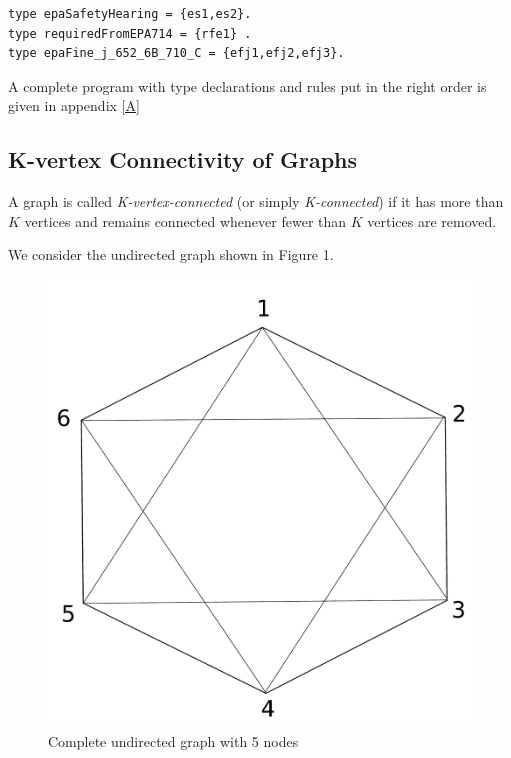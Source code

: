 \documentclass[a4paper,10pt]{article}
\begin{document}
\begin{verbatim}
type epaSafetyHearing = {es1,es2}.
type requiredFromEPA714 = {rfe1} .
type epaFine_j_652_6B_710_C = {efj1,efj2,efj3}.
\end{verbatim}

\medskip\noindent
A complete program with type declarations and rules put in the right order is given in appendix \ref{A}
   
\subsection{K-vertex Connectivity of Graphs}

A graph is called \textit{K-vertex-connected} (or simply \textit{K-connected})  if it has more than $K$ vertices and remains connected whenever fewer than $K$ vertices are removed.

\medskip\noindent
We consider the undirected graph shown in Figure 1.


\begin{figure}[h!]
\centering
\includegraphics[scale=0.3]{drawing}
\caption{Complete undirected graph with 5 nodes}
\end{figure}\label{fig1}


\noindent
\end{document}
